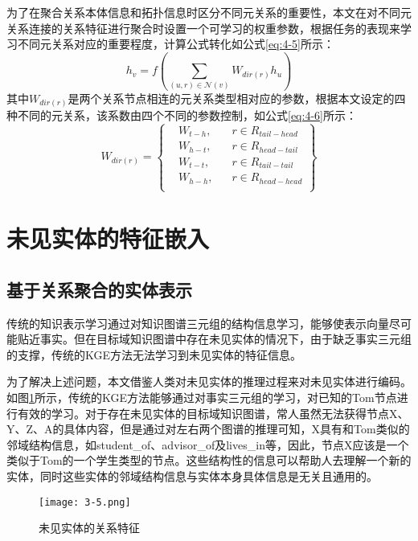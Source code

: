 为了在聚合关系本体信息和拓扑信息时区分不同元关系的重要性，本文在对不同元关系连接的关系特征进行聚合时设置一个可学习的权重参数，根据任务的表现来学习不同元关系对应的重要程度，计算公式转化如公式\ref{eq:4-5}所示：
\begin{equation}
  h_{v} = f\left( \sum_{(u,r) \in \mathcal{N}(v)} W_{ dir(r) } h_{u}\right) \label{eq:4-5}
\end{equation}
其中\(W_{dir(r)}\)是两个关系节点相连的元关系类型相对应的参数，根据本文设定的四种不同的元关系，该系数由四个不同的参数控制，如公式\ref{eq:4-6}所示：
\begin{equation}
  W_{dir(r)} = \left\{ \begin{array}{rcl}
    &W_{t-h}  \mbox{,} &\quad r \in R_{tail-head} \\
    &W_{h-t}  \mbox{,} &\quad  r \in R_{head-tail} \\
    &W_{t-t}  \mbox{,} &\quad  r \in R_{tail-tail} \\
    &W_{h-h}  \mbox{,} &\quad  r \in R_{head-head} \\
    \end{array}\right\} \label{eq:4-6}
\end{equation}

\section{未见实体的特征嵌入}
\subsection{基于关系聚合的实体表示}
传统的知识表示学习通过对知识图谱三元组的结构信息学习，能够使表示向量尽可能贴近事实。但在目标域知识图谱中存在未见实体的情况下，由于缺乏事实三元组的支撑，传统的KGE方法无法学习到未见实体的特征信息。

为了解决上述问题，本文借鉴人类对未见实体的推理过程来对未见实体进行编码。如图\ref{fig:3-5}所示，传统的KGE方法能够通过对事实三元组的学习，对已知的Tom节点进行有效的学习。对于存在未见实体的目标域知识图谱，常人虽然无法获得节点X、Y、Z、A的具体内容，但是通过对左右两个图谱的推理可知，X具有和Tom类似的邻域结构信息，如student\_of、advisor\_of及lives\_in等，因此，节点X应该是一个类似于Tom的一个学生类型的节点。这些结构性的信息可以帮助人去理解一个新的实体，同时这些实体的邻域结构信息与实体本身具体信息是无关且通用的。
\begin{figure}[h]
  \centering
  \texttt{[image: 3-5.png]}
  \caption{未见实体的关系特征}
  \label{fig:3-5}
\end{figure}

